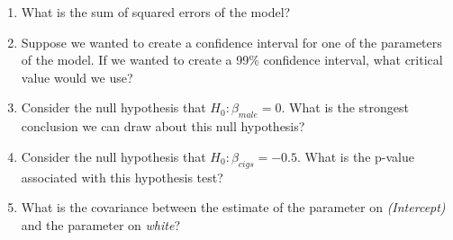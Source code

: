 \begin{enumerate}
\item What is the sum of squared errors of the model?

\item Suppose we wanted to create a confidence interval for one of the parameters of the model. If we wanted to create a 99\% confidence interval, what critical value would we use?

\item Consider the null hypothesis that $H_0:\beta_{male}=0$. What is the strongest conclusion we can draw about this null hypothesis?

\item Consider the null hypothesis that $H_0:\beta_{cigs}=-0.5$. What is the p-value associated with this hypothesis test?

\item What is the covariance between the estimate of the parameter on \textit{(Intercept)} and the parameter on \textit{white}?


\end{enumerate}
